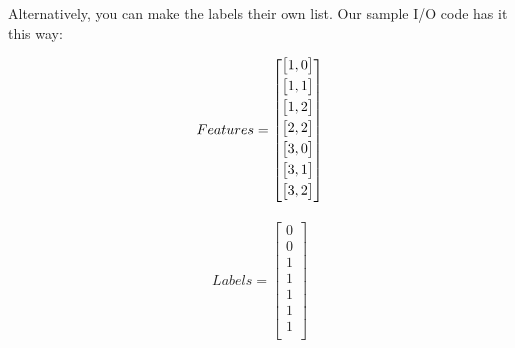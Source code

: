 \documentclass{article}
\begin{document}
Alternatively, you can make the labels their own list. Our sample I/O code has it this way:
\begin{center}
\noindent\begin{minipage}[t]{.5\textwidth}
\begin{gather*}
Features = 
\begin{bmatrix}
\vspace{1mm}
\begin{bmatrix}
 1, 0 \\
 \end{bmatrix} \\
\vspace{1mm}
 \begin{bmatrix}
 1,1 \\ 
 \end{bmatrix} \\
\vspace{1mm}
 \begin{bmatrix}
 1,2 \\ 
 \end{bmatrix} \\
\vspace{1mm}
 \begin{bmatrix}
 2,2 \\ 
 \end{bmatrix} \\
\vspace{1mm}
 \begin{bmatrix}
 3,0 \\
 \end{bmatrix} \\
\vspace{1mm}
 \begin{bmatrix}
 3,1 \\
 \end{bmatrix} \\
\vspace{1mm}
 \begin{bmatrix}
 3,2 \\
\end{bmatrix} \\
\end{bmatrix}
\end{gather*}
\end{minipage}%
\begin{minipage}[t]{.5\textwidth}
\begin{gather*}
Labels = 
 \begin{bmatrix}
 0 \\
 0 \\
 1 \\
 1 \\
 1 \\
 1 \\
 1 \\
\end{bmatrix}
\end{gather*}
\end{minipage}
\end{center}
\end{document}
